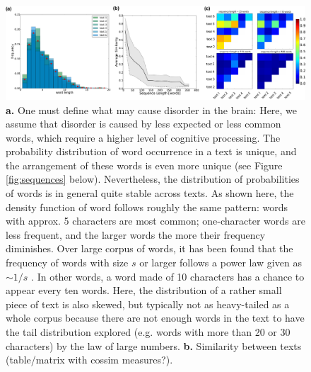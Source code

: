 \begin{figure}[H]
\centering
\includegraphics[width=17cm]{figures/word_density.png}
\caption{{\bf a.} One must define what may cause disorder in the brain: Here, we assume that disorder is caused by less expected or less common words, which require a higher level of cognitive processing. The probability distribution of word occurrence in a text is unique, and the arrangement of these words is even more unique (see Figure \ref{fig:sequences} below). Nevertheless, the distribution of probabilities of words is in general quite stable across texts. As shown here, the density function of word follows roughly the same pattern: words with approx. 5 characters are most common; one-character words are less frequent, and the larger words the more their frequency diminishes. Over large corpus of words, it has been found that the frequency of words with size $s$ or larger follows a power law given as $\sim 1/s$ \cite{wordfreq}. In other words, a word made of 10 characters has a chance to appear every ten words. Here, the distribution of a rather small piece of text is also skewed, but typically not as heavy-tailed as a whole corpus because there are not enough words in the text to have the tail distribution explored (e.g. words  with more than 20 or 30 characters) by the law of large numbers. {\bf b.} Similarity between texts (table/matrix with cossim measures?).}
\label{fig:wl_distribution}
\end{figure}


\clearpage


